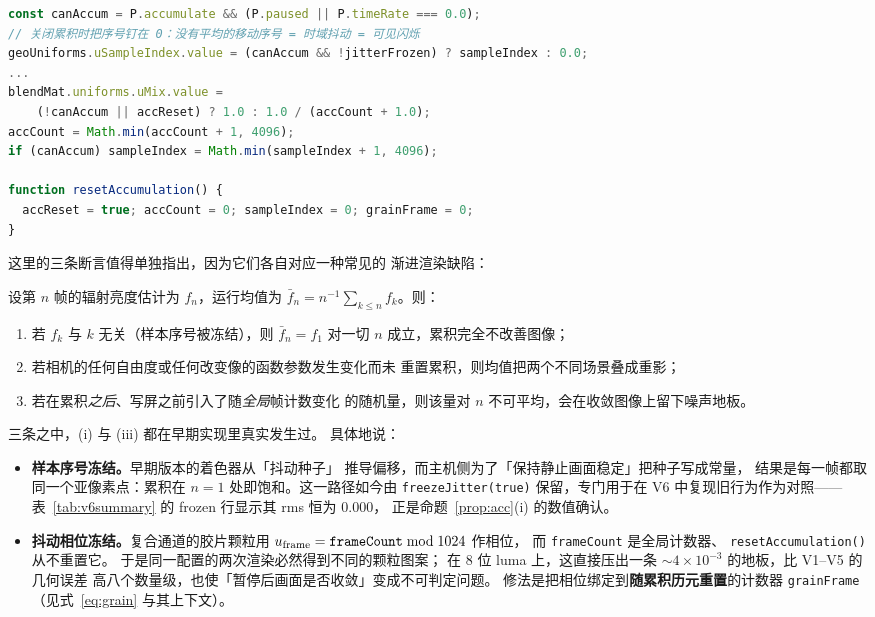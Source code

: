 \begin{lstlisting}[language=JavaScript, caption={样本序号策略与累积重置（main.js 节选）}, label={lst:acc}]
const canAccum = P.accumulate && (P.paused || P.timeRate === 0.0);
// 关闭累积时把序号钉在 0：没有平均的移动序号 = 时域抖动 = 可见闪烁
geoUniforms.uSampleIndex.value = (canAccum && !jitterFrozen) ? sampleIndex : 0.0;
...
blendMat.uniforms.uMix.value =
    (!canAccum || accReset) ? 1.0 : 1.0 / (accCount + 1.0);
accCount = Math.min(accCount + 1, 4096);
if (canAccum) sampleIndex = Math.min(sampleIndex + 1, 4096);

function resetAccumulation() {
  accReset = true; accCount = 0; sampleIndex = 0; grainFrame = 0;
}
\end{lstlisting}

\noindent
这里的三条断言值得单独指出，因为它们各自对应一种常见的
渐进渲染缺陷：

\begin{proposition}[渐进累积的三条正确性条件]
\label{prop:acc}
设第 $n$ 帧的辐射亮度估计为 $f_n$，运行均值为
$\bar f_n=n^{-1}\sum_{k\le n}f_k$。则：
\begin{enumerate}[label=(\roman*),leftmargin=1.8em,itemsep=1pt,topsep=2pt]
\item 若 $f_k$ 与 $k$ 无关（样本序号被冻结），则
      $\bar f_n=f_1$ 对一切 $n$ 成立，累积完全不改善图像；
\item 若相机的任何自由度或任何改变像的函数参数发生变化而未
      重置累积，则均值把两个不同场景叠成重影；
\item 若在累积\emph{之后}、写屏之前引入了随\emph{全局}帧计数变化
      的随机量，则该量对 $n$ 不可平均，会在收敛图像上留下噪声地板。
\end{enumerate}
\end{proposition}

\noindent 三条之中，(i) 与 (iii) 都在早期实现里真实发生过。
具体地说：

\begin{itemize}[leftmargin=1.5em,itemsep=2pt,topsep=3pt]
\item \textbf{样本序号冻结。}早期版本的着色器从「抖动种子」
      推导偏移，而主机侧为了「保持静止画面稳定」把种子写成常量，
      结果是每一帧都取同一个亚像素点：累积在
      $n=1$ 处即饱和。这一路径如今由 \texttt{freezeJitter(true)}
      保留，专门用于在 V6 中复现旧行为作为对照——
      表~\ref{tab:v6summary} 的 frozen 行显示其 rms 恒为 $0.000$，
      正是命题~\ref{prop:acc}(i) 的数值确认。
\item \textbf{抖动相位冻结。}复合通道的胶片颗粒用
      $u_{\rm frame}=\texttt{frameCount}\bmod1024$ 作相位，
      而 \texttt{frameCount} 是全局计数器、
      \texttt{resetAccumulation()} 从不重置它。
      于是同一配置的两次渲染必然得到不同的颗粒图案；
      在 8 位 luma 上，这直接压出一条
      $\sim4\times10^{-3}$ 的地板，比 V1--V5 的几何误差
      高八个数量级，也使「暂停后画面是否收敛」变成不可判定问题。
      修法是把相位绑定到\textbf{随累积历元重置}的计数器
      \texttt{grainFrame}（见式~\eqref{eq:grain} 与其上下文）。
\end{itemize}


